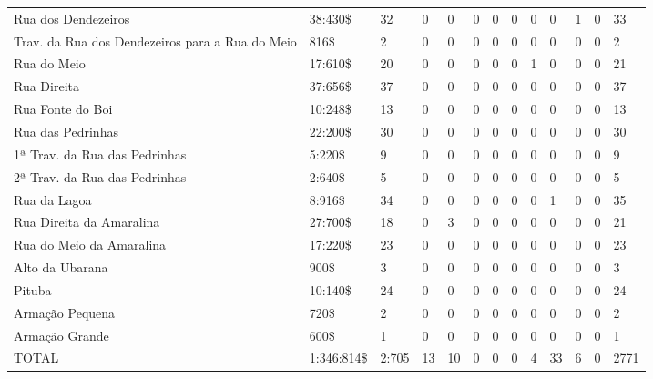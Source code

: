 \begin{table}[!htp]
{\begin{tiny}
\begin{tabular}{m{3cm} m{1cm} m{} m{} m{} m{} m{} m{} m{} m{} m{} m{} m{}}
Rua dos Dendezeiros						&38:430\$	&32	&0	&0	&0	&0	&0	&0	&0	&1	&0	&33\\
Trav. da Rua dos Dendezeiros para a Rua do Meio		&816\$		&2	&0	&0	&0	&0	&0	&0	&0	&0	&0	&2\\
Rua do Meio							&17:610\$	&20	&0	&0	&0	&0	&0	&1	&0	&0	&0	&21\\
Rua Direita							&37:656\$	&37	&0	&0	&0	&0	&0	&0	&0	&0	&0	&37\\
Rua Fonte do Boi						&10:248\$	&13	&0	&0	&0	&0	&0	&0	&0	&0	&0	&13\\
Rua das Pedrinhas						&22:200\$	&30	&0	&0	&0	&0	&0	&0	&0	&0	&0	&30\\
1ª Trav. da Rua das Pedrinhas				&5:220\$	&9	&0	&0	&0	&0	&0	&0	&0	&0	&0	&9\\
2ª Trav. da Rua das Pedrinhas				&2:640\$	&5	&0	&0	&0	&0	&0	&0	&0	&0	&0	&5\\
Rua da Lagoa							&8:916\$	&34	&0	&0	&0	&0	&0	&0	&1	&0	&0	&35\\
Rua Direita da Amaralina					&27:700\$	&18	&0	&3	&0	&0	&0	&0	&0	&0	&0	&21\\
Rua do Meio da Amaralina					&17:220\$	&23	&0	&0	&0	&0	&0	&0	&0	&0	&0	&23\\
Alto da Ubarana							&900\$		&3	&0	&0	&0	&0	&0	&0	&0	&0	&0	&3\\
Pituba								&10:140\$	&24	&0	&0	&0	&0	&0	&0	&0	&0	&0	&24\\
Armação Pequena							&720\$		&2	&0	&0	&0	&0	&0	&0	&0	&0	&0	&2\\
Armação Grande							&600\$		&1	&0	&0	&0	&0	&0	&0	&0	&0	&0	&1\\
\hline
TOTAL								&1:346:814\$	&2:705	&13	&10	&0	&0	&0	&4	&33	&6	&0	&2771\\
\hline
\end{tabular} 
\end{tiny}
}
{}
\end{table}